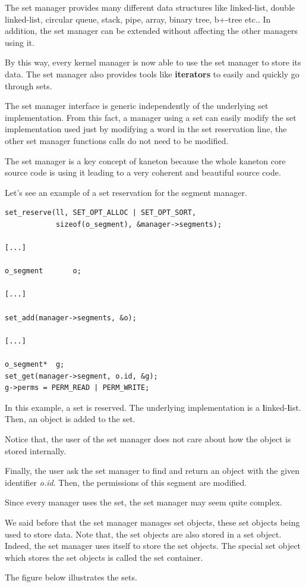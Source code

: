 \begin{multicols}{2}
The set manager provides many different data structures like linked-list,
double linked-list, circular queue, stack, pipe, array, binary tree, b+-tree
etc.. In addition, the set manager can be extended without affecting the
other managers using it.

By this way, every kernel manager is now able to use the set manager to
store its data. The set manager also provides tools like \textbf{iterators}
to easily and quickly go through sets.

The set manager interface is generic independently of the underlying set
implementation. From this fact, a manager using a set can easily modify
the set implementation used just by modifying a word in the set reservation
line, the other set manager functions calls do not need to be modified.

The set manager is a key concept of kaneton because the whole kaneton
core source code is using it leading to a very coherent and beautiful
source code.

Let's see an example of a set reservation for the segment manager.

\begin{verbatim}
set_reserve(ll, SET_OPT_ALLOC | SET_OPT_SORT,
            sizeof(o_segment), &manager->segments);

[...]

o_segment       o;

[...]

set_add(manager->segments, &o);

[...]

o_segment*	g;
set_get(manager->segment, o.id, &g);
g->perms = PERM_READ | PERM_WRITE;
\end{verbatim}

In this example, a set is reserved. The underlying implementation is
a \textbf{l}inked-\textbf{l}ist. Then, an object is added to the set.

Notice that, the user of the set manager does not care about how the
object is stored internally.

Finally, the user ask the set manager to find and return an object
with the given identifier \textit{o.id}. Then, the permissions of
this segment are modified.

Since every manager uses the set, the set manager may seem quite
complex.

We said before that the set manager manages set objects, these set objects
being used to store data. Note that, the set objects are also stored
in a set object. Indeed, the set manager uses itself to store the set
objects. The special set object which stores the set objects is called
the set container.

The figure below illustrates the sets.

\end{multicols}


